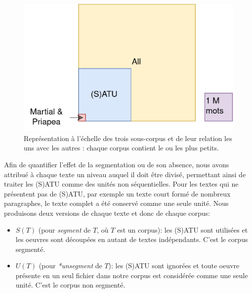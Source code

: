 \begin{figure}
    \centering
    \includegraphics[width=0.6\linewidth]{figures/chap1/part2/VennCorpus.png}
    \caption{Représentation à l'échelle des trois sous-corpus et de leur relation les uns avec les autres : chaque corpus contient le ou les plus petits. }
    \label{fig:venn}
\end{figure}

Afin de quantifier l'effet de la segmentation ou de son absence, nous avons attribué à chaque texte un niveau auquel il doit être divisé, permettant ainsi de traiter les (S)ATU comme des unités non séquentielles. Pour les textes qui ne présentent pas de (S)ATU, par exemple un texte court formé de nombreux paragraphes, le texte complet a été conservé comme une seule unité. Nous produisons deux versions de chaque texte et donc de chaque corpus:
\begin{itemize}
    \item $S(T)$ (pour \textit{segment} de $T$, où $T$ est un corpus): les (S)ATU sont utilisées et les oeuvres sont découpées en autant de textes indépendants. C'est le corpus segmenté.
    \item $U(T)$ (pour \textit{*unsegment} de $T$): les (S)ATU sont ignorées et toute oeuvre présente en un seul fichier dans notre corpus est considérée comme une seule unité. C'est le corpus non segmenté.
\end{itemize}

